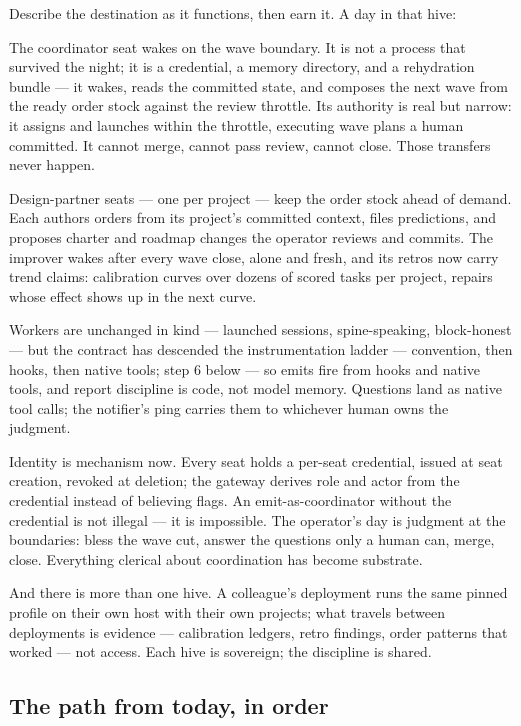 Describe the destination as it functions, then earn it. A day in that hive:

The coordinator seat wakes on the wave boundary. It is not a process that survived the night; it is a credential, a memory directory, and a rehydration bundle --- it wakes, reads the committed state, and composes the next wave from the ready order stock against the review throttle. Its authority is real but narrow: it assigns and launches within the throttle, executing wave plans a human committed. It cannot merge, cannot pass review, cannot close. Those transfers never happen.

Design-partner seats --- one per project --- keep the order stock ahead of demand. Each authors orders from its project's committed context, files predictions, and proposes charter and roadmap changes the operator reviews and commits. The improver wakes after every wave close, alone and fresh, and its retros now carry trend claims: calibration curves over dozens of scored tasks per project, repairs whose effect shows up in the next curve.

Workers are unchanged in kind --- launched sessions, spine-speaking, block-honest --- but the contract has descended the instrumentation ladder --- convention, then hooks, then native tools; step 6 below --- so emits fire from hooks and native tools, and report discipline is code, not model memory. Questions land as native tool calls; the notifier's ping carries them to whichever human owns the judgment.

Identity is mechanism now. Every seat holds a per-seat credential, issued at seat creation, revoked at deletion; the gateway derives role and actor from the credential instead of believing flags. An emit-as-coordinator without the credential is not illegal --- it is impossible. The operator's day is judgment at the boundaries: bless the wave cut, answer the questions only a human can, merge, close. Everything clerical about coordination has become substrate.

And there is more than one hive. A colleague's deployment runs the same pinned profile on their own host with their own projects; what travels between deployments is evidence --- calibration ledgers, retro findings, order patterns that worked --- not access. Each hive is sovereign; the discipline is shared.

\subsection{The path from today, in order}

